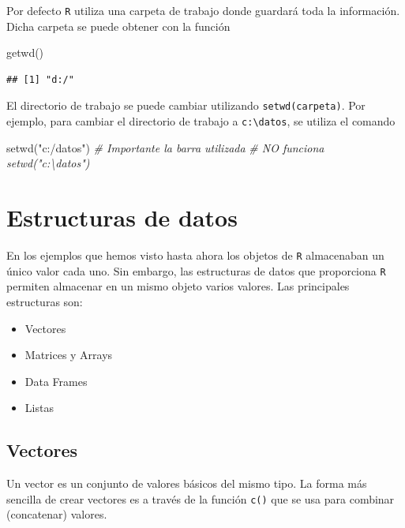 \documentclass[
]{book}
\newenvironment{Shaded}{\begin{snugshade}}{\end{snugshade}}
\newcommand{\CommentTok}[1]{\textcolor[rgb]{0.56,0.35,0.01}{\textit{#1}}}
\newcommand{\FunctionTok}[1]{\textcolor[rgb]{0.00,0.00,0.00}{#1}}
\newcommand{\NormalTok}[1]{#1}
\newcommand{\StringTok}[1]{\textcolor[rgb]{0.31,0.60,0.02}{#1}}
\theoremstyle{break}
\begin{document}
Por defecto \texttt{R} utiliza
una carpeta de trabajo donde guardará toda la información. Dicha carpeta
se puede obtener con la función

\begin{Shaded}
\begin{Highlighting}[]
\FunctionTok{getwd}\NormalTok{() }
\end{Highlighting}
\end{Shaded}

\begin{verbatim}
## [1] "d:/"
\end{verbatim}

El directorio de trabajo se puede cambiar utilizando \texttt{setwd(carpeta)}.
Por ejemplo, para cambiar el directorio de trabajo a \texttt{c:\textbackslash{}datos},
se utiliza el comando

\begin{Shaded}
\begin{Highlighting}[]
\FunctionTok{setwd}\NormalTok{(}\StringTok{"c:/datos"}\NormalTok{)}
\CommentTok{\# Importante la barra utilizada}
\CommentTok{\# NO funciona setwd("c:\textbackslash{}datos")}
\end{Highlighting}
\end{Shaded}

\hypertarget{estructuras-de-datos}{%
\chapter{Estructuras de datos}\label{estructuras-de-datos}}

En los ejemplos que hemos visto hasta ahora los objetos
de \texttt{R} almacenaban un único valor cada uno. Sin embargo, las estructuras
de datos que proporciona \texttt{R} permiten
almacenar en un mismo objeto varios valores. Las principales estructuras
son:

\begin{itemize}
\item
  Vectores
\item
  Matrices y Arrays
\item
  Data Frames
\item
  Listas
\end{itemize}

\hypertarget{vectores}{%
\section{Vectores}\label{vectores}}

Un vector es un conjunto de valores básicos del mismo tipo.
La forma más sencilla de crear vectores es a
través de la función \texttt{c()} que se usa para combinar (concatenar) valores.
\end{document}
